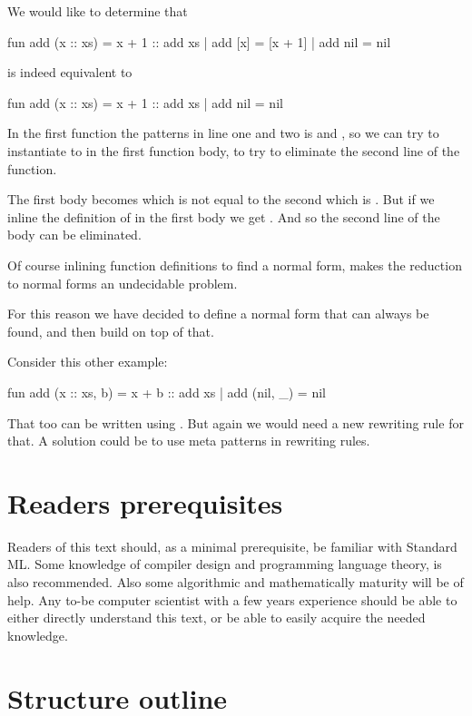We would like to determine that
\begin{sml}
fun add (x :: xs) = x + 1 :: add xs
  | add [x]       = [x + 1]
  | add nil       = nil
\end{sml}
is indeed equivalent to
\begin{sml}
fun add (x :: xs) = x + 1 :: add xs
  | add nil       = nil
\end{sml}
In the first function the patterns in line one and two is 
and , so we can try to instantiate  to
 in the first function body, to try to eliminate the second line
of the function.

The first body becomes  which is not equal to the
second which is . But if we inline the definition of
 in the first body we get . And so the
second line of the body can be eliminated.

Of course inlining function definitions to find a normal form, makes the
reduction to normal forms an undecidable problem.

For this reason we have decided to define a normal form that can always be
found, and then build on top of that.

Consider this other example:
\begin{sml}
fun add (x :: xs, b) = x + b :: add xs
  | add (nil, _)     = nil
\end{sml}
That too can be written using . But again we would need a new
rewriting rule for that. A solution could be to use meta patterns in rewriting
rules.


\section{Readers prerequisites}


Readers of this text should, as a minimal prerequisite, be familiar with
Standard ML. Some knowledge of compiler design and programming language theory,
is also recommended. Also some algorithmic and mathematically maturity will be
of help. Any to-be computer scientist with a few years experience should be able
to either directly understand this text, or be able to easily acquire the needed
knowledge.

\section{Structure outline}


